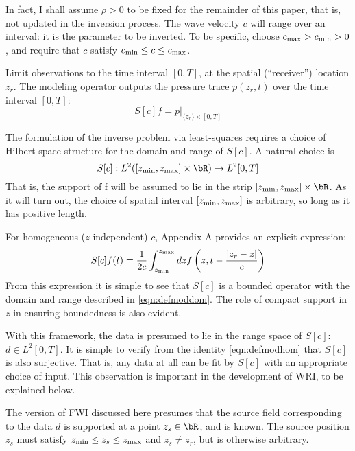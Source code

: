 In fact, I shall assume $\rho>0$ to be fixed for the remainder of this
paper, that is, not updated in the inversion process. The wave
velocity $c$ will range over an interval: it is the parameter to be inverted.
To be specific, choose $c_{\rm max} > c_{\rm min} > 0$, and require
that $c$ satisfy $c_{\rm min} \le c \le c_{\rm max}$.

Limit observations to the time interval $[0,T]$, at the spatial (``receiver'')  location $z_r$. The modeling operator outputs the pressure trace $p(z_r,t)$ over the time interval $[0,T]$:
\begin{equation}
  \label{eqn:defmod}
  S[c]f = p|_{\{z_r\}\times [0,T]}
\end{equation}

The formulation of the inverse problem via least-squares requires a choice of Hilbert space structure for the domain and range of $S[c]$. A natural choice is
\begin{equation}
  \label{eqn:defmoddom}
  S[c]: L^2([z_{\rm min},z_{\rm max}] \times \bR) \rightarrow L^2[0,T]
\end{equation}
That is, the support of f will be assumed to lie in the strip $[z_{\rm min},z_{\rm max}] \times \bR$.
As it will turn out, the choice of spatial interval $[z_{\rm min},z_{\rm max}]$ is arbitrary, so long as it has positive length.

For homogeneous ($z$-independent) $c$, Appendix A provides an explicit expression:
\begin{equation}
  \label{eqn:defmodhom}
  S[c]f(t) = \frac{1}{2c}\int_{z_{\rm min}}^{z_{\rm max}} dz f\left(z,t - \frac{|z_r-z|}{c}\right) 
\end{equation}
From this expression it is simple to see that $S[c]$ is a bounded
operator with the domain and range described in
\ref{eqn:defmoddom}. The role of compact support in $z$ in ensuring
boundedness is also evident.

With this framework, the data is presumed to lie in the range space of
$S[c]$: $d \in L^2[0,T]$. It is simple to verify from the identity
\ref{eqn:defmodhom} that $S[c]$ is also surjective. That is, any data
at all can be fit by $S[c]$ with an appropriate choice of input. This
observation is important in the development of WRI, to be explained
below.

The version of FWI discussed here presumes that the source field
corresponding to the data $d$ is supported at a point $z_s \in \bR$,
and is known. The source position $z_s$ must satisfy $z_{\rm min} \le
z_s \le z_{\rm max}$ and $z_s \ne z_r$, but is otherwise arbitrary.

